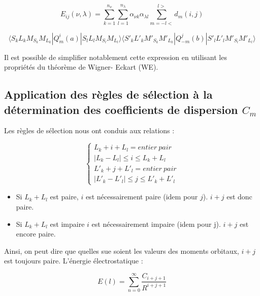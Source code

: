 	\begin{equation*}
	E_{ij}(\nu , \lambda)= \sum_{k=1}^{n_{\nu}} \sum_{l=1}^{n_{\lambda}} \alpha_{\nu k} \alpha_{\lambda l} \sum_{m=-l<}^{l>} d_{m}(i,j)
	\end{equation*}
	
	
	\begin{equation}
	\langle S_{k}L_{k}M_{S_{k}}M_{L_{k}}| Q_{m}^{i} (a)| S_{l}L_{l}M_{S_{l}}M_{L_{l}}\rangle \langle S'_{k}L'_{k}M'_{S_{k}}M'_{L_{k}}| Q_{-m}^{j} (b) | S'_{l}L'_{l}M'_{S_{l}}M'_{L_{l}}\rangle
	\end{equation}
	
	Il est possible de simplifier notablement cette expression en utilisant les propriétés du théorème de Wigner- Eckart (WE).
	
	
	\subsection{Application des règles de sélection à la détermination des coefficients de dispersion $C_{m}$}
	
	Les règles de sélection nous ont conduis aux relations :
	
	\begin{equation}
	\begin{cases}
	L_{k} + i + L_{l} = entier\ pair \\
	|L_{k} - L_{l}| \leq i \leq L_{k} + L_{l} \\
	L'_{k} + j + L'_{l} = entier\ pair \\
	|L'_{k} - L'_{l}| \leq j \leq L'_{k} + L'_{l}
	\end{cases}
	\end{equation}
	
	
	\begin{itemize}
		\item Si $L_{k} + L_{l}$ est paire, $i$ est nécessairement paire (idem pour $j$). $i + j$ est donc paire.
		
		\item Si $L_{k} + L_{l}$ est impaire $i$ est nécessairement impaire (idem pour j). $i + j$ est encore paire.
	\end{itemize}
	
	
	Ainsi, on peut dire que quelles sue soient les valeurs des moments orbitaux, $i + j$ est toujours paire. L'énergie électrostatique : 
	
	\begin{equation}
	E(l) = \sum_{n=0}^{\infty} \frac{C_{i+j+1}}{R^{i+j+1}}
	\end{equation}
	
